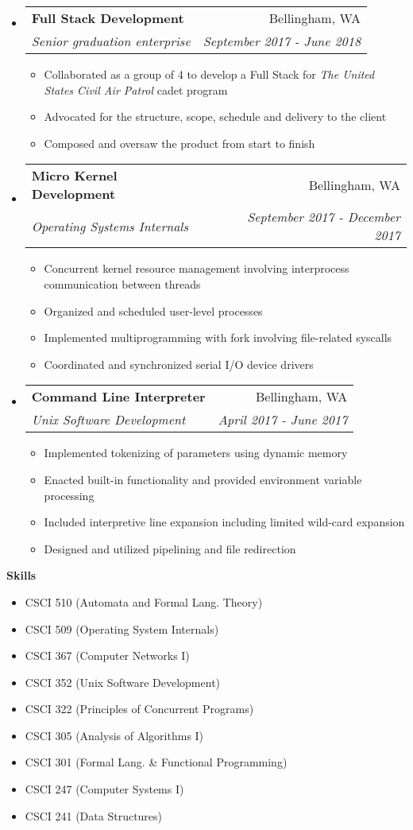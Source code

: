 \documentclass[letterpaper,11pt]{article}
\makeatletter
\newcommand{\resitem}[1]{\item #1 \vspace{-2pt}}
\newcommand{\resheading}[1]{{\large \colorbox{mygrey}{\begin{minipage}{\textwidth}{\textbf{#1 \vphantom{p\^{E}}}}\end{minipage}}}}
\newcommand{\ressubheading}[4]{
\begin{tabular*}{7.0in}{l@{\extracolsep{\fill}}r}
		\textbf{#1} & #2 \\
		\textit{#3} & \textit{#4} \\
\end{tabular*}\vspace{-6pt}}
\makeatother
\begin{document}
\begin{itemize}
\item
	\ressubheading{Full Stack Development}{Bellingham, WA}{Senior graduation enterprise}{September 2017 - June 2018}
	\begin{itemize}
		\resitem{Collaborated as a group of 4 to develop a Full Stack for \emph{The United States Civil Air Patrol} cadet program}
		\resitem{Advocated for the structure, scope, schedule and delivery to the client}
		\resitem{Composed and oversaw the product from start to finish}
	\end{itemize}
\item
	\ressubheading{Micro Kernel Development}{Bellingham, WA}{Operating Systems Internals}{September 2017 - December 2017}
	\begin{itemize}
		\resitem{Concurrent kernel resource management involving interprocess communication between threads}
		\resitem{Organized and scheduled user-level processes}
		\resitem{Implemented multiprogramming with fork involving file-related syscalls}
		\resitem{Coordinated and synchronized serial I/O device drivers}
	\end{itemize}
\item
	\ressubheading{Command Line Interpreter}{Bellingham, WA}{Unix Software Development}{April 2017 - June 2017}
	\begin{itemize}
		\resitem{Implemented tokenizing of parameters using dynamic memory}
		\resitem{Enacted built-in functionality and provided environment variable processing}
		\resitem{Included interpretive line expansion including limited wild-card expansion}
		\resitem{Designed and utilized pipelining and file redirection}
	\end{itemize}
\end{itemize}
\resheading{Skills}
\begin{multicols}{2}
\begin{itemize}
\item CSCI 510 (Automata and Formal Lang. Theory)
\item CSCI 509 (Operating System Internals)
\item CSCI 367 (Computer Networks I)
\item CSCI 352 (Unix Software Development)
\item CSCI 322 (Principles of Concurrent Programs)
\item CSCI 305 (Analysis of Algorithms I)
\item CSCI 301 (Formal Lang. \& Functional Programming)
\item CSCI 247 (Computer Systems I)
\item CSCI 241 (Data Structures)
\end{itemize}
\end{multicols}
\end{document}
